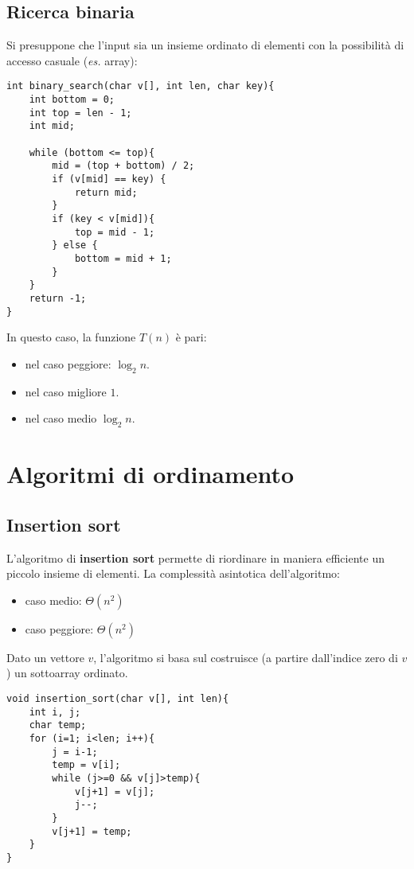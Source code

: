 \subsection{Ricerca binaria}
Si presuppone che l'input sia un insieme ordinato di elementi con la possibilità di accesso casuale (\textit{es.} array):
\begin{lstlisting}[title={Ricerca binaria}]
int binary_search(char v[], int len, char key){
    int bottom = 0;
    int top = len - 1;
    int mid;

    while (bottom <= top){
        mid = (top + bottom) / 2;
        if (v[mid] == key) {
            return mid;
        }
        if (key < v[mid]){
            top = mid - 1;
        } else {
            bottom = mid + 1;
        }
    }
    return -1;
}
\end{lstlisting}
In questo caso, la funzione $T(n)$ è pari:
\begin{itemize}[noitemsep, nolistsep]
	\item nel caso peggiore: $\log_2n$.
	\item nel caso migliore $1$.
	\item nel caso medio $\log_2n$.
\end{itemize}

\section{Algoritmi di ordinamento}

\subsection{Insertion sort}
L'algoritmo di \textbf{insertion sort} permette di riordinare in maniera efficiente un piccolo insieme di elementi.
La complessità asintotica dell'algoritmo:
\begin{itemize}[noitemsep, nolistsep]
	\item caso medio: $\varTheta(n^2)$
	\item caso peggiore: $\varTheta(n^2)$
\end{itemize}
Dato un vettore $v$, l'algoritmo si basa sul costruisce (a partire dall'indice zero di $v$) un sottoarray ordinato.
\begin{lstlisting}[title={Insertion sort}]
void insertion_sort(char v[], int len){
    int i, j;
    char temp;
    for (i=1; i<len; i++){
        j = i-1;
        temp = v[i];
        while (j>=0 && v[j]>temp){
            v[j+1] = v[j];
            j--;
        }
        v[j+1] = temp;
    }
}
\end{lstlisting}

